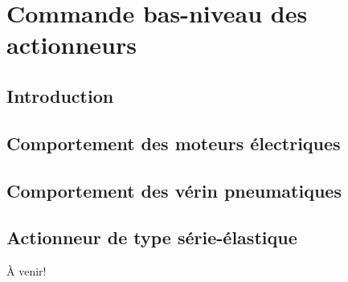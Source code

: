\chapter{Commande bas-niveau des actionneurs}
\label{sec:actuatorcontrol}


\section{Introduction}


\section{Comportement des moteurs électriques}

\section{Comportement des vérin pneumatiques}

\section{Actionneur de type série-élastique}

À venir!